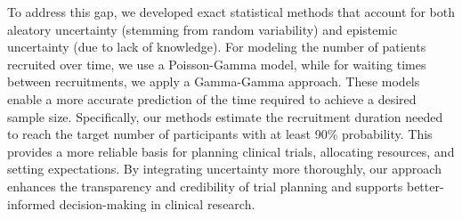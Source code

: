 \documentclass[11pt,a4paper,twoside]{book}
\begin{document}
To address this gap, we developed exact statistical methods that account for both aleatory uncertainty (stemming from random variability) and epistemic uncertainty (due to lack of knowledge). For modeling the number of patients recruited over time, we use a Poisson-Gamma model, while for waiting times between recruitments, we apply a Gamma-Gamma approach. These models enable a more accurate prediction of the time required to achieve a desired sample size. Specifically, our methods estimate the recruitment duration needed to reach the target number of participants with at least 90\% probability. This provides a more reliable basis for planning clinical trials, allocating resources, and setting expectations. By integrating uncertainty more thoroughly, our approach enhances the transparency and credibility of trial planning and supports better-informed decision-making in clinical research.

\vspace{2em}  %
















\appendix



\cleardoublepage
{}
{}


 


\cleardoublepage
\end{document}
